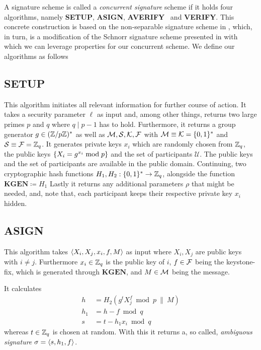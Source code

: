 A signature scheme is called a \textit{concurrent signature} scheme if it holds four algorithms, namely \textbf{SETUP}, \textbf{ASIGN}, \textbf{AVERIFY}~ and \textbf{VERIFY}.
This concrete construction is based on the non-separable signature scheme in \cite{abe20021}, which, in turn, is a modification of the Schnorr signature scheme presented in \cite{schnorr1991efficient} with which we can leverage properties for our concurrent scheme.
We define our algorithms as follows
   
\subsection{\textbf{SETUP}}
  This algorithm initiates all relevant information for further course of action.
  It takes a security parameter \(\ell\) as input and, among other things, returns two large primes \(p\) and \(q\) where \(q \mid p-1\) has to hold.
  Furthermore, it returns a group generator \(g\in(\mathbb{Z}/p\mathbb{Z})^\ast\) as well as \(\mathcal{M}, \mathcal{S}, \mathcal{K}, \mathcal{F}\) with \(\mathcal{M} \equiv \mathcal{K} =  \{ 0,1 \}^\ast\) and \(\mathcal{S} \equiv \mathcal{F} = \mathbb{Z}_q\).
  It generates private keys \(x_i\) which are randomly chosen from \(\mathbb{Z}_q\), the public keys \( \{ X_i = g^{x_i} \bmod p \}\) and the set of participants \(\mathcal{U}\).
  The public keys and the set of participants are available in the public domain.
  Continuing, two cryptographic hash functions \(H_1, H_2:  \{ 0,1 \}^\ast \to \mathbb{Z}_q\), alongside the function \(\textbf{KGEN} \coloneqq H_1\)
  Lastly it returns any additional parameters \(\rho\) that might be needed, and, note that, each participant keeps their respective private key \(x_i\) hidden. 

\subsection{\textbf{ASIGN}}
  This algorithm takes \(\langle X_i, X_j, x_i, f, M \rangle\) as input where \(X_i, X_j\) are public keys with \(i\neq j\).
  Furthermore \(x_i\in\mathbb{Z}_q\) is the public key of \(i\), \(f\in\mathcal{F}\) being the keystone-fix, which is generated through \(\textbf{KGEN}\), and \(M\in\mathcal{M}\) being the message.
  
  It calculates
    \begin{align*}
      h &= H_2(g^t X_j^f \bmod p ~\|~ M)\\
      h_1 &= h - f \bmod q\\
      s &= t - h_1 x_i \bmod q
    \end{align*}
  whereas \(t\in \mathbb{Z}_q\) is chosen at random.
  With this it returns a, so called, \textit{ambiguous signature} \(\sigma=\langle s, h_1, f \rangle\).

